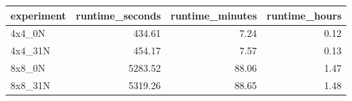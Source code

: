 \begin{tabular}{lrrr}
\toprule
experiment & runtime_seconds & runtime_minutes & runtime_hours \\
\midrule
4x4_0N & 434.61 & 7.24 & 0.12 \\
4x4_31N & 454.17 & 7.57 & 0.13 \\
8x8_0N & 5283.52 & 88.06 & 1.47 \\
8x8_31N & 5319.26 & 88.65 & 1.48 \\
\bottomrule
\end{tabular}
